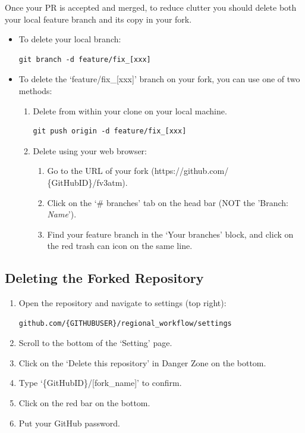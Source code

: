 \documentclass[11pt,fleqn]{report}              %
\begin{document}
Once your PR is accepted and merged, to reduce clutter you should delete both your local feature branch and its copy in your fork.
\begin{itemize}
\item To delete your local branch:
\lstset{language=bash}   
\begin{lstlisting}[frame=trBL]
git branch -d feature/fix_[xxx]
\end{lstlisting}

\item To delete the `feature/fix\_[xxx]' branch on your fork, you can use one of two methods:
\begin{enumerate}
\item Delete from within your clone on your local machine.
\lstset{language=bash}   
\begin{lstlisting}[frame=trBL]
git push origin -d feature/fix_[xxx]
\end{lstlisting}
\item Delete using your web browser:
\begin{enumerate}
\item Go to the URL of your fork (https://github.com/ \{GitHubID\}/fv3atm). 
\item Click on the `\# branches' tab on the head bar (NOT the 'Branch: {\it Name}').
\item Find your feature branch in the `Your branches' block, and click on the red trash can icon on the same line.
\end{enumerate}

\end{enumerate}
\end{itemize}



\subsection{Deleting the Forked Repository}

\begin{enumerate}
\item Open the repository and navigate to settings (top right):
\lstset{language=bash}   
\begin{lstlisting}[frame=trBL]
github.com/{GITHUBUSER}/regional_workflow/settings
\end{lstlisting}

\item Scroll to the bottom of the `Setting' page.

\item Click on the `Delete this repository' in Danger Zone on the bottom.

\item Type `\{GitHubID\}/[fork\_name]' to confirm.

\item Click on the red bar on the bottom.

\item Put your GitHub password.

\end{enumerate}
\end{document}
